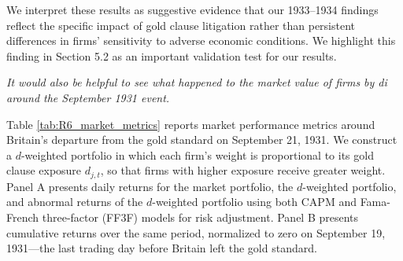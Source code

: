 We interpret these results as suggestive evidence that our 1933--1934 findings reflect the specific impact of gold clause litigation rather than persistent differences in firms' sensitivity to adverse economic conditions. We highlight this finding in Section 5.2 as an important validation test for our results.

\bigskip

\textit{\textcolor{red!60!black}{
It would also be helpful to see what happened to the market value of firms by di around the September 1931 event.
}}

\bigskip

\noindent Table \ref{tab:R6_market_metrics} reports market performance metrics around Britain's departure from the gold standard on September 21, 1931. We construct a $d$-weighted portfolio in which each firm's weight is proportional to its gold clause exposure $d_{j,t}$, so that firms with higher exposure receive greater weight. Panel A presents daily returns for the market portfolio, the $d$-weighted portfolio, and abnormal returns of the $d$-weighted portfolio using both CAPM and Fama-French three-factor (FF3F) models for risk adjustment. Panel B presents cumulative returns over the same period, normalized to zero on September 19, 1931---the last trading day before Britain left the gold standard.

